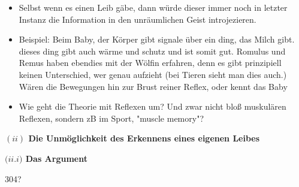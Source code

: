 \documentclass[a4paper, 12pt]{article}
\begin{document}
\begin{onehalfspace}
\begin{itemize}
  \item Selbst wenn es einen Leib gäbe, dann würde dieser immer noch in letzter Instanz die Information in den unräumlichen Geist introjezieren.
  \item Beispiel: Beim Baby, der Körper gibt signale über ein ding, das Milch gibt. dieses ding gibt auch wärme und schutz und ist somit gut. Romulus und Remus haben ebendies mit der Wölfin erfahren, denn es gibt prinzipiell keinen Unterschied, wer genau aufzieht (bei Tieren sieht man dies auch.) Wären die Bewegungen hin zur Brust reiner Reflex, oder kennt das Baby 
  \item Wie geht die Theorie mit Reflexen um? Und zwar nicht bloß muskulären Reflexen, sondern zB im Sport, "muscle memory"?
\end{itemize}


\vspace{5mm}
\noindent\textbf{$(ii)$ Die Unmöglichkeit des Erkennens eines eigenen Leibes}

\vspace{3mm}
\noindent\textbf{$(ii.$\footnotesize$i$\normalsize$)$ Das Argument}

304? 


\end{onehalfspace}
\end{document}
